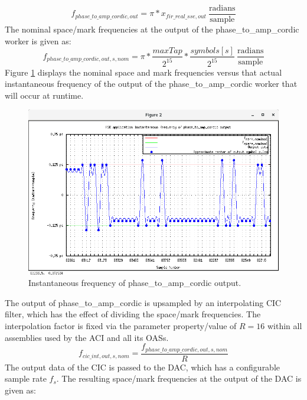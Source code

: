 	\begin{equation}
		f_{phase\_to\_amp\_cordic,out} = \pi * x_{fir\_real\_sse,out} \ \frac{\text{radians}}{\text{sample}}
	\end{equation}
The nominal space/mark frequencies at the output of the phase\_to\_amp\_cordic worker is given as:
	\begin{equation}
		f_{phase\_to\_amp\_cordic,out,s,nom} = \pi * \frac{maxTap}{2^{15}} * \frac{symbols[s]}{2^{15}} \ \frac{\text{radians}}{\text{sample}}
	\end{equation}
Figure \ref{fig:mark_space_freq} displays the nominal space and mark frequencies versus that actual instantaneous frequency of the output of the phase\_to\_amp\_cordic worker that will occur at runtime.
	\begin{figure}[ht]
	 	\centering
	 	\begin{minipage}{0.7\textwidth}
			\centering\includegraphics[trim=0.2cm 0.6cm 0.1cm 2.8cm,clip,width=1.0\linewidth]{mark_space_freq}
			\caption{Instantaneous frequency of phase\_to\_amp\_cordic output.}
			\label{fig:mark_space_freq}
		\end{minipage}
	\end{figure}
The output of phase\_to\_amp\_cordic is upsampled by an interpolating CIC filter, which has the effect of dividing the space/mark frequencies. The interpolation factor is fixed via the parameter property/value of $R=16$ within all assemblies used by the ACI and all its OASs.
	\begin{equation} \label{eq:cic}
		f_{cic\_int,out,s,nom} = \frac{f_{phase\_to\_amp\_cordic,out,s,nom}}{R}
	\end{equation}
The output data of the CIC is passed to the DAC, which has a configurable sample rate $f_s$. The resulting space/mark frequencies at the output of the DAC is given as:

